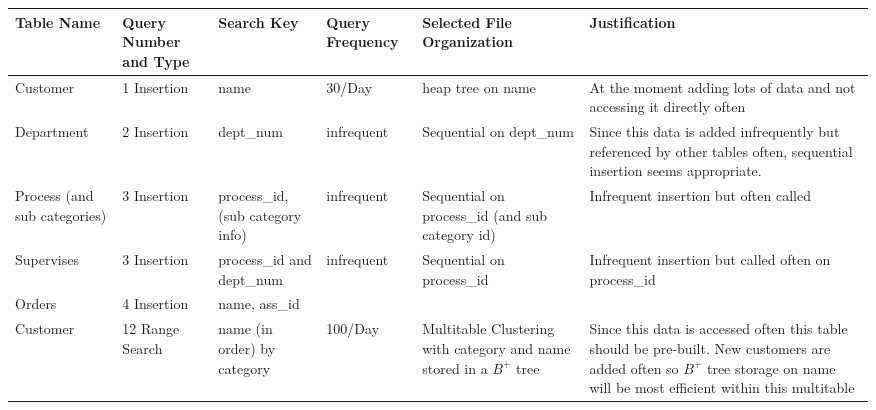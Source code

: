 \documentclass[11pt]{article}
\begin{document}
\begin{tabular}{|p{.75in}|p{.75in}|p{.75in}|p{.65in}|p{.75in}|p{1.75in}|}\hline
Table Name & Query Number and Type & Search Key& Query Frequency& Selected File Organization & Justification\\ \hline\hline
Customer & 1 Insertion & name & 30/Day & heap tree on name & At the moment adding lots of data and not accessing it directly often\\ \hline 
Department & 2 Insertion& dept\_num & infrequent & Sequential on dept\_num & Since this data is added infrequently but referenced by other tables often, sequential insertion seems appropriate.\\ \hline
Process (and sub categories)& 3 Insertion & process\_id,  (sub category info) & infrequent & Sequential on process\_id (and sub category id)&  Infrequent insertion but often called\\ \hline
Supervises & 3 Insertion & process\_id and dept\_num & infrequent & Sequential on process\_id &Infrequent insertion but called often on process\_id\\\hline
Orders & 4 Insertion & name, ass\_id&   \\ \hline

Customer & 12 Range Search & name (in order) by category &100/Day & Multitable Clustering with category and name stored in a $B^+$ tree& Since this data is accessed often this table should be pre-built.  New customers are added often so $B^+$ tree storage on name will be most efficient within this multitable\\\hline
\end{tabular}
\end{document}
